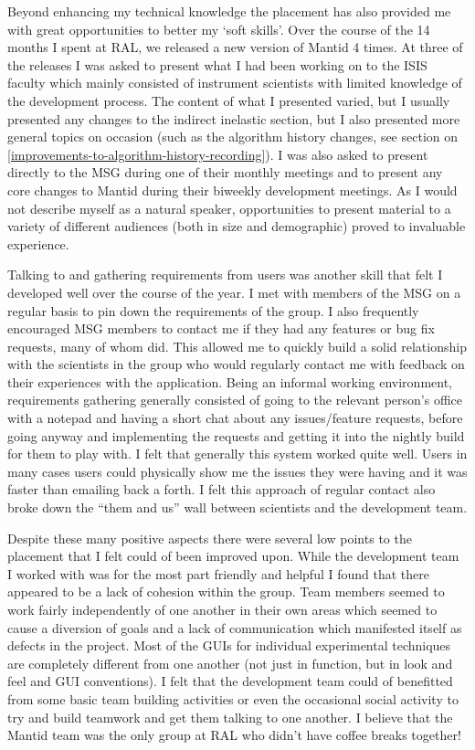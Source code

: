 \documentclass[paper=a4, fontsize=11pt]{scrartcl}	%
\numberwithin{equation}{section}															%
\numberwithin{figure}{section}																%
\numberwithin{table}{section}
\begin{document}
Beyond enhancing my technical knowledge the placement has also provided
me with great opportunities to better my `soft skills'. Over the course
of the 14 months I spent at RAL, we released a new version of Mantid 4
times. At three of the releases I was asked to present what I had been
working on to the ISIS faculty which mainly consisted of instrument
scientists with limited knowledge of the development process. The content of what I presented varied, but I usually
presented any changes to the indirect inelastic section, but I also
presented more general topics on occasion (such as the algorithm history
changes, see section on
\ref{improvements-to-algorithm-history-recording}). I was also asked to present directly to
the MSG during one of their monthly meetings and to present any core
changes to Mantid during their biweekly development meetings. As I would
not describe myself as a natural speaker, opportunities to present
material to a variety of different audiences (both in size and
demographic) proved to invaluable experience.

Talking to and gathering requirements from users was another skill that
felt I developed well over the course of the year. I met with members of
the MSG on a regular basis to pin down the requirements of the group. I
also frequently encouraged MSG members to contact me if they had any
features or bug fix requests, many of whom did. This allowed me to
quickly build a solid relationship with the scientists in the group who
would regularly contact me with feedback on their experiences with the application. Being an informal working
environment, requirements gathering generally consisted of going to the relevant person's office with a notepad
and having a short chat about any issues/feature requests, before going
anyway and implementing the requests and getting it into the nightly
build for them to play with. I felt that generally this system worked
quite well. Users in many cases users could physically show me the
issues they were having and it was faster than emailing back a forth. I
felt this approach of regular contact also broke down the ``them and
us'' wall between scientists and the development team.

Despite these many positive aspects there were several low points to
the placement that I felt could of been improved upon. While the
development team I worked with was for the most part friendly and
helpful I found that there appeared to be a lack of cohesion within the
group. Team members seemed to work fairly independently of one another
in their own areas which seemed to cause a diversion of goals and a lack
of communication which manifested itself as defects in the project. Most
of the GUIs for individual experimental techniques are completely
different from one another (not just in function, but in look and feel
and GUI conventions). I felt that the development team could of
benefitted from some basic team building activities or even the
occasional social activity to try and build teamwork and get them
talking to one another. I believe that the Mantid team was the only
group at RAL who didn't have coffee breaks together!
\end{document}
